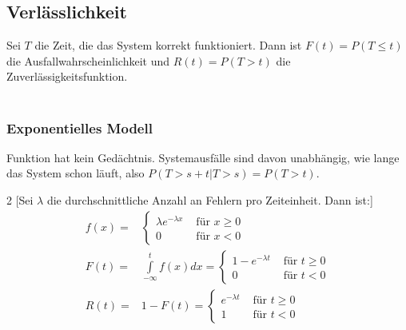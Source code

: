 \subsection{Verlässlichkeit}
Sei $T$ die Zeit, die das System korrekt funktioniert. Dann ist $F(t)=P(T\leq t)$ die Ausfallwahrscheinlichkeit und $R(t)=P(T>t)$ die Zuverlässigkeitsfunktion.\\\\

\subsubsection{Exponentielles Modell}
Funktion hat kein Gedächtnis. Systemausfälle sind davon unabhängig, wie lange das System schon läuft, also $P(T>s+t|T>s)=P(T>t)$.\\

\begin{multicols}{2}
	[Sei $\lambda$ die durchschnittliche Anzahl an Fehlern pro Zeiteinheit. Dann ist:]
	\begin{align*}
		f(x)= &
		\begin{cases}
			\lambda e^{-\lambda x} & \text{ für } x\geq0 \\
			0                      & \text{ für } x<0
		\end{cases} \\
		F(t)= & \int\limits_{-\infty}^t f(x) dx =
		\begin{cases}
			1-e^{-\lambda t} & \text{ für } t\geq0 \\
			0                & \text{ für } t<0
		\end{cases}       \\
		R(t)= & 1-F(t) =
		\begin{cases}
			e^{-\lambda t} & \text{ für } t\geq0 \\
			1              & \text{ für } t<0
		\end{cases}
	\end{align*}

	\columnbreak


\end{multicols}

